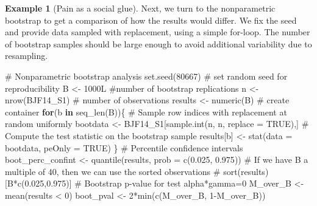 \documentclass[
  11pt,
  letterpaper,
]{scrbook}
\newenvironment{Shaded}{\begin{snugshade}}{\end{snugshade}}
\newcommand{\AttributeTok}[1]{\textcolor[rgb]{0.40,0.45,0.13}{#1}}
\newcommand{\CommentTok}[1]{\textcolor[rgb]{0.37,0.37,0.37}{#1}}
\newcommand{\ConstantTok}[1]{\textcolor[rgb]{0.56,0.35,0.01}{#1}}
\newcommand{\ControlFlowTok}[1]{\textcolor[rgb]{0.00,0.23,0.31}{\textbf{#1}}}
\newcommand{\DecValTok}[1]{\textcolor[rgb]{0.68,0.00,0.00}{#1}}
\newcommand{\FloatTok}[1]{\textcolor[rgb]{0.68,0.00,0.00}{#1}}
\newcommand{\FunctionTok}[1]{\textcolor[rgb]{0.28,0.35,0.67}{#1}}
\newcommand{\NormalTok}[1]{\textcolor[rgb]{0.00,0.23,0.31}{#1}}
\newcommand{\OtherTok}[1]{\textcolor[rgb]{0.00,0.23,0.31}{#1}}
\newcommand{\SpecialCharTok}[1]{\textcolor[rgb]{0.37,0.37,0.37}{#1}}
\theoremstyle{definition}
\newtheorem{example}{Example}[chapter]
\theoremstyle{definition}
\theoremstyle{remark}
\begin{document}
\begin{example}[Pain as a social
glue]
Next, we turn to the nonparametric bootstrap to get a comparison of how
the results would differ. We fix the seed and provide data sampled with
replacement, using a simple for-loop. The number of bootstrap samples
should be large enough to avoid additional variability due to
resampling.

\begin{Shaded}
\begin{Highlighting}[]
\CommentTok{\# Nonparametric bootstrap analysis}
\FunctionTok{set.seed}\NormalTok{(}\DecValTok{80667}\NormalTok{) }\CommentTok{\# set random seed for reproducibility}
\NormalTok{B }\OtherTok{\textless{}{-}} \DecValTok{1000}\NormalTok{L }\CommentTok{\#number of bootstrap replications}
\NormalTok{n }\OtherTok{\textless{}{-}} \FunctionTok{nrow}\NormalTok{(BJF14\_S1) }\CommentTok{\# number of observations}
\NormalTok{results }\OtherTok{\textless{}{-}} \FunctionTok{numeric}\NormalTok{(B) }\CommentTok{\# create container}
\ControlFlowTok{for}\NormalTok{(b }\ControlFlowTok{in} \FunctionTok{seq\_len}\NormalTok{(B))\{}
  \CommentTok{\# Sample row indices with replacement at random uniformly}
\NormalTok{  bootdata }\OtherTok{\textless{}{-}}\NormalTok{ BJF14\_S1[}\FunctionTok{sample.int}\NormalTok{(n, n, }\AttributeTok{replace =} \ConstantTok{TRUE}\NormalTok{),]}
  \CommentTok{\# Compute the test statistic on the bootstrap sample}
\NormalTok{  results[b] }\OtherTok{\textless{}{-}} \FunctionTok{stat}\NormalTok{(}\AttributeTok{data =}\NormalTok{ bootdata, }\AttributeTok{peOnly =} \ConstantTok{TRUE}\NormalTok{)}
\NormalTok{\}}
\CommentTok{\# Percentile confidence intervals}
\NormalTok{boot\_perc\_confint }\OtherTok{\textless{}{-}} \FunctionTok{quantile}\NormalTok{(results, }\AttributeTok{prob =} \FunctionTok{c}\NormalTok{(}\FloatTok{0.025}\NormalTok{, }\FloatTok{0.975}\NormalTok{))}
\CommentTok{\# If we have B a multiple of 40, then we can use the sorted observations}
\CommentTok{\# sort(results)[B*c(0.025,0.975)]}
\CommentTok{\# Bootstrap p{-}value for test alpha*gamma=0}
\NormalTok{M\_over\_B }\OtherTok{\textless{}{-}} \FunctionTok{mean}\NormalTok{(results }\SpecialCharTok{\textless{}} \DecValTok{0}\NormalTok{)}
\NormalTok{boot\_pval }\OtherTok{\textless{}{-}} \DecValTok{2}\SpecialCharTok{*}\FunctionTok{min}\NormalTok{(}\FunctionTok{c}\NormalTok{(M\_over\_B, }\DecValTok{1}\SpecialCharTok{{-}}\NormalTok{M\_over\_B))}
\end{Highlighting}
\end{Shaded}

\begin{longtable}[]{@{}rrrrr@{}}


\end{longtable}
\end{example}
\end{document}
